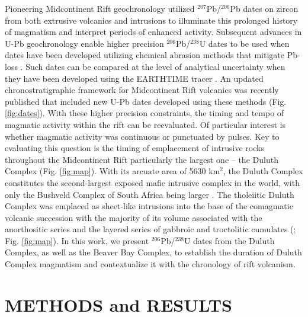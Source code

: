 \documentclass[11pt,letterpaper]{article}
\begin{document}
Pioneering Midcontinent Rift geochronology utilized $^{207}$Pb/$^{206}$Pb dates on zircon from both extrusive volcanics \citep{Davis1997a} and intrusions \citep{Paces1993a} to illuminate this prolonged history of magmatism and interpret periods of enhanced activity. Subsequent advances in U-Pb geochronology enable higher precision $^{206}$Pb/$^{238}$U dates to be used when dates have been developed utilizing chemical abrasion methods that mitigate Pb-loss \citep{Mattinson2005a}. Such dates can be compared at the level of analytical uncertainty when they have been developed using the EARTHTIME tracer \citep{Condon2015a}. An updated chronostratigraphic framework for Midcontinent Rift volcanics was recently published \citep{Swanson-Hysell2019a} that included new U-Pb dates developed using these methods (Fig. \ref{fig:dates}). With these higher precision constraints, the timing and tempo of magmatic activity within the rift can be reevaluated. Of particular interest is whether magmatic activity was continuous or punctuated by pulses. Key to evaluating this question is the timing of emplacement of intrusive rocks throughout the Midcontinent Rift particularly the largest one -- the Duluth Complex (Fig. \ref{fig:map}). With its arcuate area of 5630 km$^2$, the Duluth Complex constitutes the second-largest exposed mafic intrusive complex in the world, with only the Bushveld Complex of South Africa being larger \citep{Miller2002c}. The tholeiitic Duluth Complex was emplaced as sheet-like intrusions into the base of the comagmatic volcanic succession with the majority of its volume associated with the anorthositic series and the layered series of gabbroic and troctolitic cumulates (\citealp{Miller2002c}; Fig. \ref{fig:map}). In this work, we present $^{206}$Pb/$^{238}$U dates from the Duluth Complex, as well as the Beaver Bay Complex, to establish the duration of Duluth Complex magmatism and contextualize it with the chronology of rift volcanism.

\section*{METHODS and RESULTS}
\end{document}
